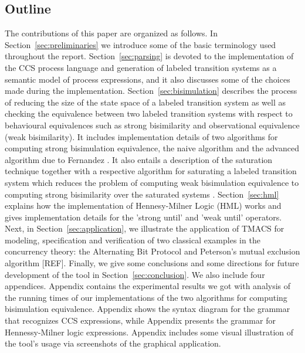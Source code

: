 \subsection{Outline} The contributions of this paper are organized as follows. In Section~\ref{sec:preliminaries} we introduce some of the basic terminology used throughout the report. Section~\ref{sec:parsing} is devoted to the implementation of the CCS process language and generation of labeled transition systems as a semantic model of process expressions, and it also discusses some of the choices made during the implementation. Section~\ref{sec:bisimulation} describes the process of reducing the size of the state space of a labeled transition system as well as checking the equivalence between two labeled transition systems with respect to behavioural equivalences such as strong bisimilarity and observational equivalence (weak bisimilarity). It includes implementation details of two algorithms for computing strong bisimulation equivalence, the naive algorithm \cite{ReactiveSystems} and the advanced algorithm due to Fernandez \cite{Fernandez}. It also entails a description of the saturation technique together with a respective algorithm for saturating a labeled transition system which reduces the problem of computing weak bisimulation equivalence to computing strong bisimilarity over the saturated systems \cite{ReactiveSystems}. Section~\ref{sec:hml} explains how the implementation of Hennesy-Milner Logic (HML) works and gives implementation details for the 'strong until' and 'weak until' operators. Next, in Section~\ref{sec:application}, we illustrate the application of TMACS for modeling, specification and verification of two classical examples in the concurrency theory: the Alternating Bit Protocol and Peterson's mutual exclusion algorithm [REF]. Finally, we give some conclusions and some directions for future development of the tool in Section~\ref{sec:conclusion}. We also include four appendices. Appendix \cite{appendixA} contains the experimental results we got with analysis of the running times of our implementations of the two algorithms for computing bisimulation equivalence. Appendix \cite{appendixB} shows the syntax diagram for the grammar that recognizes CCS expressions, while Appendix \cite{appendixC} presents the grammar for Hennessy-Milner logic expressions. Appendix \cite{appendixD} includes some visual illustration of the tool's usage via screenshots of the graphical application.
